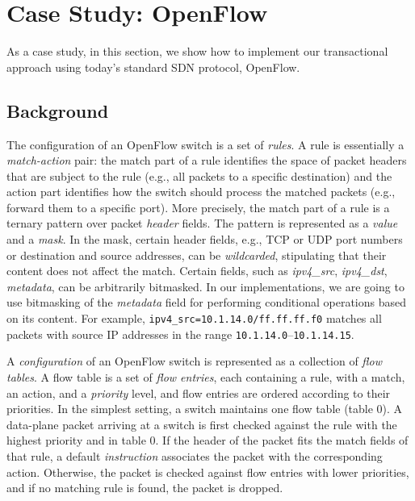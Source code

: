 \documentclass{sig-alternate-2006}
\newcommand{\liron}[1]{\textit{\textcolor{mypurple}{[liron]: #1}}} %
\newcommand{\petr}[1]{\textit{\textcolor{blue}{[petr]: #1}}} %
\begin{document}
\section{Case Study: OpenFlow}\label{sec:background}

As a case study, in this section, we show how to implement
our transactional approach using today's standard SDN protocol,
 OpenFlow. 

\subsection{Background}

The configuration of an OpenFlow switch is a set of
\emph{rules}.
A rule is essentially a \emph{match-action} pair:
the match part of a rule identifies the space of packet headers that are
subject to the rule (e.g., all packets to a specific destination) and
the action part identifies how the switch should process the matched
packets (e.g., forward them to a specific port).
More precisely, the match part of a rule is
a ternary pattern over packet \emph{header} fields.
The pattern is represented as a \emph{value} and a \emph{mask}.
In the mask, certain header fields, e.g., TCP or UDP port numbers or destination and source
addresses, can be \emph{wildcarded}, stipulating that their content does
not affect the match.
Certain fields, such as \emph{ipv4\_src}, \emph{ipv4\_dst}, \emph{metadata}, can be arbitrarily
bitmasked.
In our implementations, we are going to use bitmasking of the \emph{metadata}
field for performing conditional operations based on  its content.
For example, \texttt{ipv4\_src=10.1.14.0/ff.ff.ff.f0} matches all packets
with source IP addresses in the range \texttt{10.1.14.0}--\texttt{10.1.14.15}.

A \emph{configuration} of an OpenFlow switch is represented as a
collection of \emph{flow tables}.
A flow table is a set of \emph{flow entries}, each containing a rule,
with a match, an action, and a \emph{priority} level, and flow entries
are ordered according to their priorities.
In the simplest setting, a switch maintains one flow table (table 0).
A data-plane packet arriving at a switch is first checked against
the rule with the highest priority and in table $0$.
If the header of the packet fits the match fields of that rule,
a default \emph{instruction} associates the packet with the corresponding action.
Otherwise, the packet is checked against flow  entries with lower
priorities, and if no matching rule is found, the packet is dropped.
\end{document}
